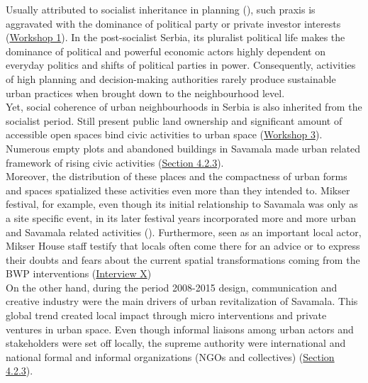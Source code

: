 \documentclass[11pt]{report}
\begin{document}
Usually attributed to socialist inheritance in planning (\cite{ref Vujosevic}),
such praxis is aggravated with the dominance of political party or private investor interests
(\href{Expert Workshop}{Workshop 1}).
In the post-socialist Serbia, its pluralist political life makes the dominance of political and powerful economic actors highly dependent on everyday politics and shifts of political parties in power.
Consequently, activities of high planning and decision-making authorities rarely produce sustainable urban practices when brought down to the neighbourhood level.
\\

Yet, social coherence of urban neighbourhoods in Serbia is also inherited from the socialist period.
Still present public land ownership and significant amount of accessible open spaces bind civic activities to urban space
(\href{Student Workshop}{Workshop 3}).
Numerous empty plots and abandoned buildings in Savamala made urban related framework of rising civic activities (\href{Section 4.2.3}{Section 4.2.3}).
\\

Moreover, the distribution of these places and the compactness of urban forms and spaces spatialized these activities even more than they intended to.
Mikser festival, for example, even though its initial relationship to Savamala was only as a site specific event, in its later festival years incorporated more and more urban and Savamala related activities
(\cite{(check ref  web The Game of Savamala and XXXX, Mikser Festival 2014)}).
Furthermore, seen as an important local actor, Mikser House staff testify that locals often come there for an advice or to express their doubts and fears about the current spatial transformations coming from the BWP interventions 
(\href{InterviewX}{Interview X})
\\

On the other hand, during the period 2008-2015 design, communication and creative industry were the main drivers of urban revitalization of Savamala.
This global trend created local impact through micro interventions and private ventures in urban space.
Even though informal liaisons among urban actors and stakeholders were set off locally, the supreme  authority were international and national formal and informal organizations (NGOs and collectives) (\href{Section 4.2.3}{Section 4.2.3}). %
\\
\end{document}
